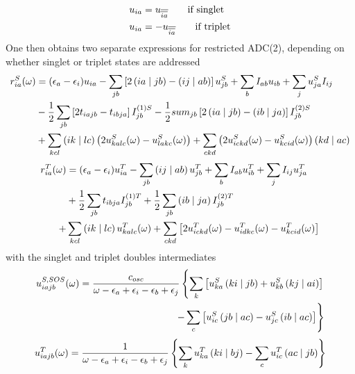 \begin{equation}
\begin{split}
u_{ia} &= u_{\overline{\overline{ia}}} \qquad \textrm{if singlet} \\
u_{ia} &= - u_{\overline{\overline{ia}}} \qquad \textrm{if triplet} 
\end{split}
\end{equation}
\noindent One then obtains two separate expressions for restricted ADC(2), depending on whether singlet or triplet states are addressed
\begin{equation}
\begin{split}
r_{ia}^S(\omega) &= (\epsilon_a - \epsilon_i) u_{ia} - \sum_{jb} \left[ 2\left( ia \mid jb \right) - \left( ij \mid ab \right) \right] u_{jb}^S + \sum_b I_{ab} u_{ib} + \sum_j u_{ja}^S I_{ij} \\
&- \frac{1}{2} \sum_{jb} \left[2t_{iajb} - t_{ibja}\right] I^{(1)S}_{jb} - \frac{1}{2} sum_{jb} \left[ 2 \left( ia \mid jb \right) - \left( ib \mid ja \right) \right] I^{(2)S}_{jb} \\
&+ \sum_{kcl} \left( ik \mid lc \right) \left( 2 u_{kalc}^S(\omega) - u_{lakc}^S(\omega) \right) + \sum_{ckd} \left( 2 u^S_{ickd}(\omega) - u^S_{kcid}(\omega) \right) \left( kd \mid ac \right)  
\end{split}
\end{equation} 
\begin{equation}
\begin{split}
r_{ia}^T(\omega) &= (\epsilon_a - \epsilon_i) u_{ia}^T - \sum_{jb} \left( ij \mid ab \right) u_{jb}^T + \sum_b I_{ab} u_{ib}^T + \sum_j I_{ij} u_{ja}^T \\
&+ \frac{1}{2} \sum_{jb} t_{ibja} I^{(1)T}_{jb} + \frac{1}{2} \sum_{jb} \left( ib \mid ja \right) I^{(2)T}_{jb} \\
+& \sum_{kcl} \left( ik \mid lc \right) u^T_{kalc}(\omega) + \sum_{ckd} \left[ 2 u^T_{ickd}(\omega) - u^T_{idkc}(\omega) - u^T_{kcid}(\omega) \right] 
\end{split}
\end{equation}
\noindent with the singlet and triplet doubles intermediates
\begin{equation}
\begin{split}
u^{S,SOS}_{iajb}(\omega) = \frac{c_{osc}}{\omega - \epsilon_a + \epsilon_i - \epsilon_b + \epsilon_j} \left\lbrace \sum_k \left[ u^S_{ka} \left( ki \mid jb \right) + u^S_{kb} \left( kj \mid ai \right) \right] \right. \\
\left. - \sum_c \left[ u^S_{ic} \left( jb \mid ac \right) - u^S_{jc} \left( ib \mid ac \right) \right] \right\rbrace
\end{split} 
\end{equation}
\begin{equation}
u^T_{iajb}(\omega) = \frac{1}{\omega - \epsilon_a + \epsilon_i - \epsilon_b + \epsilon_j} \left\lbrace \sum_k u^T_{ka} \left( ki \mid bj \right) - \sum_c u^T_{ic} \left( ac \mid jb \right) \right\rbrace
\end{equation}

